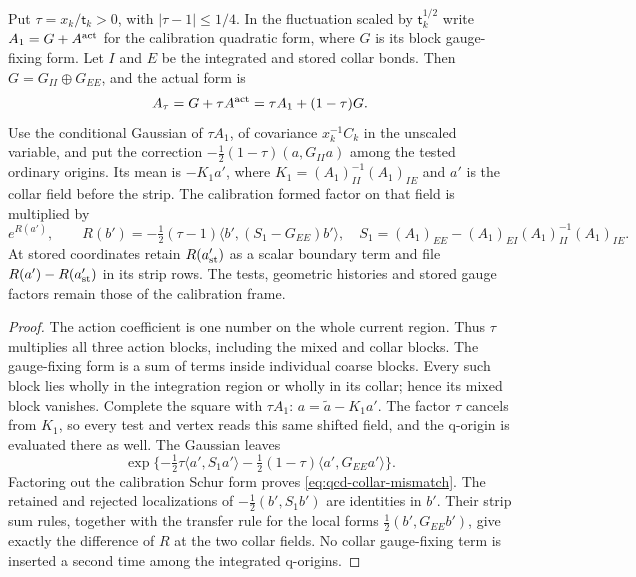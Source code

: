 \documentclass[11pt,letterpaper,reqno]{amsart}
\makeatletter
\theoremstyle{definition}
\newcommand{\ms@minorstart}{%
  \pushQED{\qed}\renewcommand{\qedsymbol}{$\blacksquare$}}
\newenvironment{lemma}[1][]{\ms@minorstart\ms@lemma[#1]}
  {\popQED\endms@lemma}
\theoremstyle{remark}
\makeatother
\begin{document}
\begin{lemma}[The quadratic form of the actual step]
\label{C-399-33}
Put $\tau=x_k/\mathsf t_k>0$, with $|\tau-1|\le1/4$.
In the fluctuation scaled by $\mathsf t_k^{1/2}$ write
$A_1=G+A^{\rm act}$ for the calibration quadratic form,
where $G$ is its block gauge-fixing form. Let $I$ and $E$
be the integrated and stored collar bonds. Then
$G=G_{II}\oplus G_{EE}$, and the actual form is
\[
 A_\tau=G+\tau A^{\rm act}=\tau A_1+(1-\tau)G.
\]
Use the conditional Gaussian of $\tau A_1$, of covariance
$x_k^{-1}C_k$ in the unscaled variable, and put the correction
$-\tfrac12(1-\tau)(a,G_{II}a)$ among the tested ordinary
origins. Its mean is
$-K_1a'$, where
$K_1=(A_1)_{II}^{-1}(A_1)_{IE}$ and $a'$ is the collar
field before the strip. The calibration formed factor on
that field is multiplied by
\begin{equation}\label{eq:qcd-collar-mismatch}
 e^{R(a')},\qquad
 R(b')=-\tfrac12(\tau-1)
       \langle b',(S_1-G_{EE})b'\rangle,\quad
 S_1=(A_1)_{EE}-(A_1)_{EI}(A_1)_{II}^{-1}(A_1)_{IE}.
\end{equation}
At stored coordinates retain $R(a'_{\rm st})$ as a scalar
boundary term and file $R(a')-R(a'_{\rm st})$ in its strip
rows. The tests, geometric histories and stored gauge
factors remain those of the calibration frame.
\end{lemma}
\begin{proof}
The action coefficient is one number on the whole current
region. Thus $\tau$ multiplies all three action blocks,
including the mixed and collar blocks. The gauge-fixing
form is a sum of terms inside individual coarse blocks.
Every such block lies wholly in the integration region
or wholly in its collar; hence its mixed block vanishes.
Complete the square with $\tau A_1$:
$a=\widetilde a-K_1a'$. The factor $\tau$ cancels from
$K_1$, so every test and vertex reads this same shifted
field, and the q-origin is evaluated there as well.
The Gaussian leaves
\[
 \exp\{-\tfrac12\tau\langle a',S_1a'\rangle
             -\tfrac12(1-\tau)\langle a',G_{EE}a'\rangle\}.
\]
Factoring out the calibration Schur form proves
\eqref{eq:qcd-collar-mismatch}. The retained and rejected
localizations of $-\frac12(b',S_1b')$ are identities in
$b'$. Their strip sum rules, together with the transfer
rule for the local forms $\frac12(b',G_{EE}b')$, give
exactly the difference of $R$ at the two collar fields.
No collar gauge-fixing term is inserted a second time
among the integrated q-origins.
\end{proof}
\end{document}

